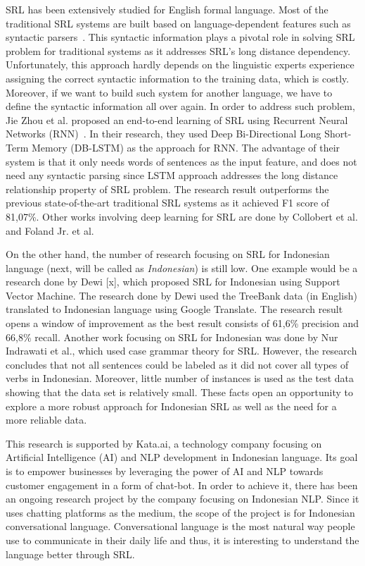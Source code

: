 SRL has been extensively studied for English formal language. Most of the traditional SRL systems are built based on language-dependent features such as syntactic parsers~\citep{gildea2002automatic, gildea2002necessity, pradhan2005semantic}. This syntactic information plays a pivotal role in solving SRL problem for traditional systems as it addresses SRL's long distance dependency. Unfortunately, this approach hardly depends on the linguistic experts experience assigning the correct syntactic information to the training data, which is costly. Moreover, if we want to build such system for another language, we have to define the syntactic information all over again. In order to address such problem, Jie Zhou et al. proposed an end-to-end learning of SRL using Recurrent Neural Networks (RNN)~\citep{zhou2015end}. In their research, they used Deep Bi-Directional Long Short-Term Memory (DB-LSTM) as the approach for RNN. The advantage of their system is that it only needs words of sentences as the input feature, and does not need any syntactic parsing since LSTM approach addresses the long distance relationship property of SRL problem. The research result outperforms the previous state-of-the-art traditional SRL systems as it achieved F1 score of 81,07\%. Other works involving deep learning for SRL are done by Collobert et al. and Foland Jr. et al.

On the other hand, the number of research focusing on SRL for Indonesian language (next, will be called as \textit{Indonesian}) is still low. One example would be a research done by Dewi [x], which proposed SRL for Indonesian using Support Vector Machine. The research done by Dewi used the TreeBank data (in English) translated to Indonesian language using Google Translate. The research result opens a window of improvement as the best result consists of 61,6\% precision and 66,8\% recall. Another work focusing on SRL for Indonesian was done by Nur Indrawati et al., which used case grammar theory for SRL. However, the research concludes that not all sentences could be labeled as it did not cover all types of verbs in Indonesian. Moreover, little number of instances is used as the test data showing that the data set is relatively small. These facts open an opportunity to explore a more robust approach for Indonesian SRL as well as the need for a more reliable data.

This research is supported by Kata.ai, a technology company focusing on Artificial Intelligence (AI) and NLP development in Indonesian language. Its goal is to empower businesses by leveraging the power of AI and NLP towards customer engagement in a form of chat-bot. In order to achieve it, there has been an ongoing research project by the company focusing on Indonesian NLP. Since it uses chatting platforms as the medium, the scope of the project is for Indonesian conversational language. Conversational language is the most natural way people use to communicate in their daily life and thus, it is interesting to understand the language better through SRL.

